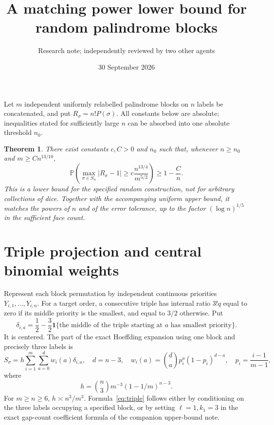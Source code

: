 \documentclass[11pt]{article}
\title{A matching power lower bound for random palindrome blocks}
\author{Research note; independently reviewed by two other agents}
\date{30 September 2026}
\newtheorem{theorem}{Theorem}
\newcommand{\Prob}{\mathbb P}
\begin{document}
\maketitle

Let $m$ independent uniformly relabelled palindrome blocks on $n$ labels
be concatenated, and put $R_\sigma=n!P(\sigma)$.
All constants below are absolute; inequalities stated for sufficiently
large $n$ can be absorbed into one absolute threshold $n_0$.

\begin{theorem}\label{thm:lower}
There exist constants $c,C>0$ and $n_0$ such that, whenever
$n\geq n_0$ and $m\geq Cn^{13/10}$,
\[
 \Prob\left(\max_{\sigma\in S_n}|R_\sigma-1|
       \geq c\frac{n^{13/4}}{m^{5/2}}\right)\geq1-\frac Cn.
\]
This is a lower bound for the specified random construction, not for
arbitrary collections of dice. Together with the accompanying uniform
upper bound, it matches the powers of $n$ and of the error tolerance,
up to the factor $(\log n)^{1/5}$ in the sufficient face count.
\end{theorem}

\section{Triple projection and central binomial weights}
Represent each block permutation by independent continuous priorities
$Y_{i,1},\ldots,Y_{i,n}$. For a target order, a consecutive triple has
internal ratio $3!q$ equal to zero if its middle priority is the smallest,
and equal to $3/2$ otherwise. Put
\[
 \delta_{i,a}=\frac12-\frac32\mathbf1\{\text{the middle of the triple
 starting at }a\text{ has smallest priority}\}.
\]
It is centered. The part of the exact Hoeffding expansion using one block
and precisely three labels is
\begin{equation}\label{eq:triple}
 S_\sigma=h\sum_{i=1}^m\sum_{a=0}^{d}w_i(a)\delta_{i,a},
 \quad d=n-3,\quad
 w_i(a)=\binom da p_i^a(1-p_i)^{d-a},\quad
 p_i=\frac{i-1}{m-1},
\end{equation}
where
\[
 h=\binom n3m^{-3}(1-1/m)^{n-3}.
\]
For $m\geq n\geq6$, $h\asymp n^3/m^3$. Formula~\eqref{eq:triple}
follows either by conditioning on the three labels occupying a specified
block, or by setting $\ell=1,k_1=3$ in the exact gap-count coefficient
formula of the companion upper-bound note.
\end{document}
